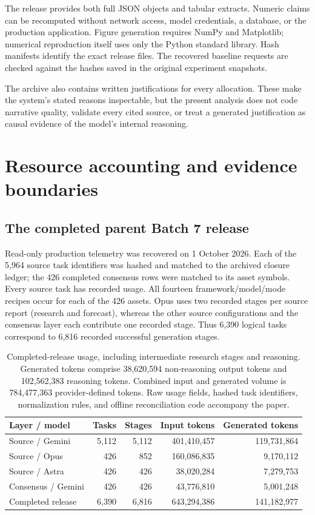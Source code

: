 \documentclass[11pt]{article}
\begin{document}
The release provides both full JSON objects and tabular extracts. Numeric claims can be recomputed without network access, model credentials, a database, or the production application. Figure generation requires NumPy and Matplotlib; numerical reproduction itself uses only the Python standard library. Hash manifests identify the exact release files. The recovered baseline requests are checked against the hashes saved in the original experiment snapshots.

The archive also contains written justifications for every allocation. These make the system's stated reasons inspectable, but the present analysis does not code narrative quality, validate every cited source, or treat a generated justification as causal evidence of the model's internal reasoning.

\clearpage
\section{Resource accounting and evidence boundaries}\label{app:resources}
\subsection{The completed parent Batch 7 release}
Read-only production telemetry was recovered on 1 October 2026. Each of the 5,964 source task identifiers was hashed and matched to the archived closure ledger; the 426 completed consensus rows were matched to its asset symbols. Every source task has recorded usage. All fourteen framework/model/mode recipes occur for each of the 426 assets. Opus uses two recorded stages per source report (research and forecast), whereas the other source configurations and the consensus layer each contribute one recorded stage. Thus 6,390 logical tasks correspond to 6,816 recorded successful generation stages.

\begin{table}[H]
\centering\small
\begin{tabular}{@{}lrrrr@{}}
\toprule
Layer / model & Tasks & Stages & Input tokens & Generated tokens \\
\midrule
Source / Gemini & 5,112 & 5,112 & 401,410,457 & 119,731,864 \\
Source / Opus & 426 & 852 & 160,086,835 & 9,170,112 \\
Source / Astra & 426 & 426 & 38,020,284 & 7,279,753 \\
Consensus / Gemini & 426 & 426 & 43,776,810 & 5,001,248 \\
\midrule
Completed release & 6,390 & 6,816 & 643,294,386 & 141,182,977 \\
\bottomrule
\end{tabular}
\caption{Completed-release usage, including intermediate research stages and reasoning. Generated tokens comprise 38,620,594 non-reasoning output tokens and 102,562,383 reasoning tokens. Combined input and generated volume is 784,477,363 provider-defined tokens. Raw usage fields, hashed task identifiers, normalization rules, and offline reconciliation code accompany the paper.}
\label{tab:parentusage}
\end{table}
\end{document}
